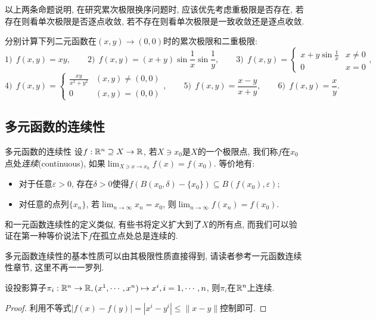 以上两条命题说明, 在研究累次极限换序问题时, 应该优先考虑重极限是否存在, 若存在则看单次极限是否逐点收敛, 若不存在则看单次极限是一致收敛还是逐点收敛. 

\begin{example}
	分别计算下列二元函数在$(x,y) \to (0,0)$时的累次极限和二重极限: $$1)~~f(x,y) = xy,\qquad 2)~~f(x,y) = (x+y)\sin \frac{1}{x} \sin \frac{1}{y},\qquad 3)~~f(x,y) = \begin{cases} x+y\sin \frac{1}{x} & x\neq 0 \\ 0 & x=0 \end{cases}, $$
	$$4)~~f(x,y) = \begin{cases} \frac{xy}{x^2+y^2} &  (x,y) \neq (0,0) \\ 0 &  (x,y) = (0,0) \end{cases},\qquad 5)~~f(x,y)=\frac{x-y}{x+y},\qquad 6)~~f(x,y)=\frac{x}{y}. $$
\end{example}

\subsection{多元函数的连续性}

\begin{definition}{多元函数的连续性}
	设$f:\mathbb{R} ^n \supseteq X \to \mathbb{R}$, 若$X \ni x_0$是$X$的一个极限点, 我们称$f$在$x_0$点处\textit{连续}(continuous), 如果$\lim_{X \ni x \to x_0} f(x) = f(x_0)$. 等价地有: 
	\begin{itemize}
		\item 对于任意$\varepsilon >0$, 存在$\delta >0$使得$f(B(x_0,\delta) - \{ x_0 \}) \subseteq B(f(x_0),\varepsilon)$; 
		\item 对任意的点列$\{ x_n \}$, 若$\lim_{n \to \infty} x_n = x_0$, 则$\lim_{n \to \infty} f(x_n) = f(x_0)$. 
	\end{itemize}
\end{definition}
\begin{remark}
	和一元函数连续性的定义类似, 有些书将定义扩大到了$X$的所有点, 而我们可以验证在第一种等价说法下$f$在孤立点处总是连续的. 
\end{remark}

多元函数连续性的基本性质可以由其极限性质直接得到, 请读者参考一元函数连续性章节, 这里不再一一罗列. 

\begin{example}
	设投影算子$\pi _i :\mathbb{R} ^n \to \mathbb{R} ,(x^1,\cdots ,x^n) \mapsto x^i,i=1,\cdots ,n$, 则$\pi _i$在$\mathbb{R} ^n$上连续. 
\end{example}
\begin{proof}
	利用不等式$|f(x)-f(y)|=|x^i - y^i| \leq \| x-y \|$控制即可. 
\end{proof}

